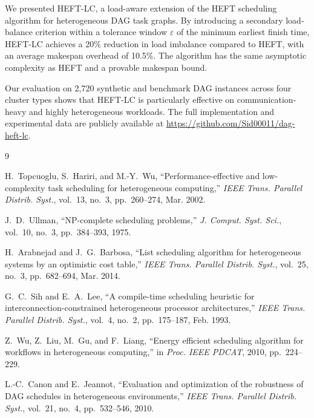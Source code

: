\documentclass[conference]{IEEEtran}
\begin{document}
We presented HEFT-LC, a load-aware extension of the HEFT scheduling
algorithm for heterogeneous DAG task graphs. By introducing a secondary
load-balance criterion within a tolerance window $\varepsilon$ of the
minimum earliest finish time, HEFT-LC achieves a 20\% reduction in load
imbalance compared to HEFT, with an average makespan overhead of 10.5\%.
The algorithm has the same asymptotic complexity as HEFT and a provable
makespan bound.

Our evaluation on 2{,}720 synthetic and benchmark DAG instances across
four cluster types shows that HEFT-LC is particularly effective on
communication-heavy and highly heterogeneous workloads.
The full implementation and experimental data are publicly available
at \url{https://github.com/Sid00011/dag-heft-lc}.

\begin{thebibliography}{9}

H.~Topcuoglu, S.~Hariri, and M.-Y.~Wu,
``Performance-effective and low-complexity task scheduling for
heterogeneous computing,''
\textit{IEEE Trans. Parallel Distrib. Syst.}, vol.~13, no.~3,
pp.~260--274, Mar. 2002.

J.~D.~Ullman,
``NP-complete scheduling problems,''
\textit{J. Comput. Syst. Sci.}, vol.~10, no.~3, pp.~384--393, 1975.

H.~Arabnejad and J.~G.~Barbosa,
``List scheduling algorithm for heterogeneous systems by an optimistic
cost table,''
\textit{IEEE Trans. Parallel Distrib. Syst.}, vol.~25, no.~3,
pp.~682--694, Mar. 2014.

G.~C.~Sih and E.~A.~Lee,
``A compile-time scheduling heuristic for interconnection-constrained
heterogeneous processor architectures,''
\textit{IEEE Trans. Parallel Distrib. Syst.}, vol.~4, no.~2,
pp.~175--187, Feb. 1993.

Z.~Wu, Z.~Liu, M.~Gu, and F.~Liang,
``Energy efficient scheduling algorithm for workflows in heterogeneous
computing,''
in \textit{Proc. IEEE PDCAT}, 2010, pp.~224--229.

L.-C.~Canon and E.~Jeannot,
``Evaluation and optimization of the robustness of DAG schedules in
heterogeneous environments,''
\textit{IEEE Trans. Parallel Distrib. Syst.}, vol.~21, no.~4,
pp.~532--546, 2010.

\end{thebibliography}
\end{document}
